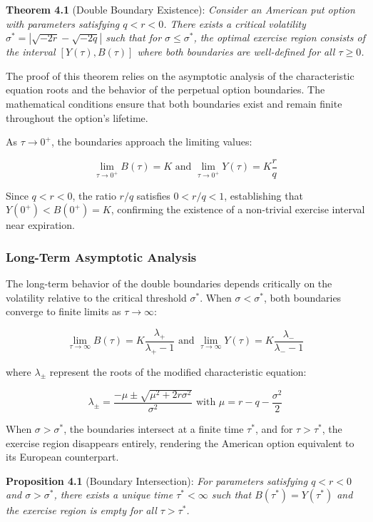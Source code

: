 \documentclass[
  11pt,
  11pt,
  letterpaper,
  onecolumn]{article}
\begin{document}
\textbf{Theorem 4.1} (Double Boundary Existence): \emph{Consider an
American put option with parameters satisfying \(q < r < 0\). There
exists a critical volatility \(\sigma^* = |\sqrt{-2r} - \sqrt{-2q}|\)
such that for \(\sigma \leq \sigma^*\), the optimal exercise region
consists of the interval \([Y(\tau), B(\tau)]\) where both boundaries
are well-defined for all \(\tau \geq 0\).}

The proof of this theorem relies on the asymptotic analysis of the
characteristic equation roots and the behavior of the perpetual option
boundaries. The mathematical conditions ensure that both boundaries
exist and remain finite throughout the option's lifetime.

As \(\tau \to 0^+\), the boundaries approach the limiting values:

\[\lim_{\tau \to 0^+} B(\tau) = K \text{ and } \lim_{\tau \to 0^+} Y(\tau) = K \frac{r}{q} \tag{4.1}\]

Since \(q < r < 0\), the ratio \(r/q\) satisfies \(0 < r/q < 1\),
establishing that \(Y(0^+) < B(0^+) = K\), confirming the existence of a
non-trivial exercise interval near expiration.

\subsubsection{Long-Term Asymptotic
Analysis}\label{long-term-asymptotic-analysis}

The long-term behavior of the double boundaries depends critically on
the volatility relative to the critical threshold \(\sigma^*\). When
\(\sigma < \sigma^*\), both boundaries converge to finite limits as
\(\tau \to \infty\):

\[\lim_{\tau \to \infty} B(\tau) = K \frac{\lambda_+}{\lambda_+ - 1} \text{ and } \lim_{\tau \to \infty} Y(\tau) = K \frac{\lambda_-}{\lambda_- - 1} \tag{4.2}\]

where \(\lambda_{\pm}\) represent the roots of the modified
characteristic equation:

\[\lambda_{\pm} = \frac{-\mu \pm \sqrt{\mu^2 + 2r\sigma^2}}{\sigma^2} \text{ with } \mu = r - q - \frac{\sigma^2}{2} \tag{4.3}\]

When \(\sigma > \sigma^*\), the boundaries intersect at a finite time
\(\tau^*\), and for \(\tau > \tau^*\), the exercise region disappears
entirely, rendering the American option equivalent to its European
counterpart.

\textbf{Proposition 4.1} (Boundary Intersection): \emph{For parameters
satisfying \(q < r < 0\) and \(\sigma > \sigma^*\), there exists a
unique time \(\tau^* < \infty\) such that \(B(\tau^*) = Y(\tau^*)\) and
the exercise region is empty for all \(\tau > \tau^*\).}
\end{document}
